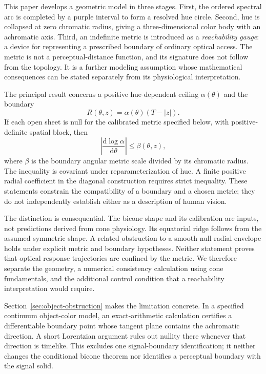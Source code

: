 \documentclass[11pt,letterpaper]{article}
\theoremstyle{plain}
\newcommand{\dd}{\mathrm{d}}
\begin{document}
This paper develops a geometric model in three stages. First, the ordered spectral arc is completed by a purple interval to form a resolved hue circle. Second, hue is collapsed at zero chromatic radius, giving a three-dimensional color body with an achromatic axis. Third, an indefinite metric is introduced as a \emph{reachability gauge}: a device for representing a prescribed boundary of ordinary optical access. The metric is not a perceptual-distance function, and its signature does not follow from the topology. It is a further modeling assumption whose mathematical consequences can be stated separately from its physiological interpretation.

The principal result concerns a positive hue-dependent ceiling $\alpha(\theta)$ and the boundary
\begin{equation}
 R(\theta,z)=\alpha(\theta)(T-|z|).
 \label{eq:boundary-intro}
\end{equation}
If each open sheet is null for the calibrated metric specified below, with positive-definite spatial block, then
\begin{equation}
 \left|\frac{\dd\log\alpha}{\dd\theta}\right|\leq\beta(\theta,z),
 \label{eq:bound-intro}
\end{equation}
where $\beta$ is the boundary angular metric scale divided by its chromatic radius. The inequality is covariant under reparameterization of hue. A finite positive radial coefficient in the diagonal construction requires strict inequality. These statements constrain the compatibility of a boundary and a chosen metric; they do not independently establish either as a description of human vision.

The distinction is consequential. The bicone shape and its calibration are inputs, not predictions derived from cone physiology. Its equatorial ridge follows from the assumed symmetric shape. A related obstruction to a smooth null radial envelope holds under explicit metric and boundary hypotheses. Neither statement proves that optical response trajectories are confined by the metric. We therefore separate the geometry, a numerical consistency calculation using cone fundamentals, and the additional control condition that a reachability interpretation would require.

Section~\ref{sec:object-obstruction} makes the limitation concrete. In a specified continuum object-color model, an exact-arithmetic calculation certifies a differentiable boundary point whose tangent plane contains the achromatic direction. A short Lorentzian argument rules out nullity there whenever that direction is timelike. This excludes one signal-boundary identification; it neither changes the conditional bicone theorem nor identifies a perceptual boundary with the signal solid.
\end{document}
